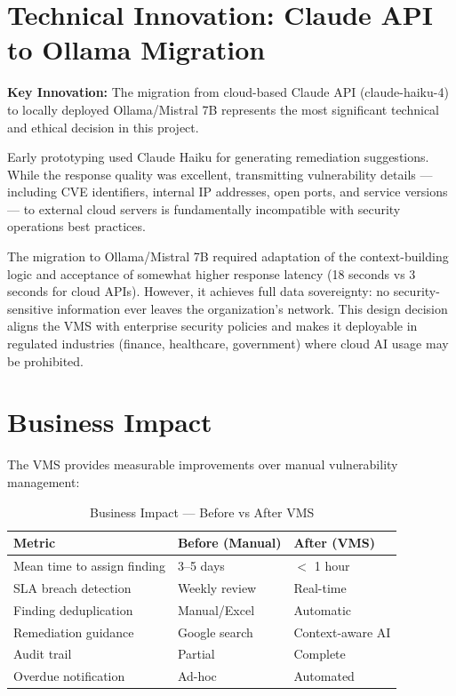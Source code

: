 \section*{Technical Innovation: Claude API to Ollama Migration}

\begin{importantbox}
\textbf{Key Innovation:} The migration from cloud-based Claude API (claude-haiku-4) to locally deployed Ollama/Mistral 7B represents the most significant technical and ethical decision in this project.

Early prototyping used Claude Haiku for generating remediation suggestions. While the response quality was excellent, transmitting vulnerability details — including CVE identifiers, internal IP addresses, open ports, and service versions — to external cloud servers is fundamentally incompatible with security operations best practices.

The migration to Ollama/Mistral 7B required adaptation of the context-building logic and acceptance of somewhat higher response latency (18 seconds vs 3 seconds for cloud APIs). However, it achieves full data sovereignty: no security-sensitive information ever leaves the organization's network. This design decision aligns the VMS with enterprise security policies and makes it deployable in regulated industries (finance, healthcare, government) where cloud AI usage may be prohibited.
\end{importantbox}

\section*{Business Impact}

The VMS provides measurable improvements over manual vulnerability management:

\begin{table}[H]
\centering
\caption{Business Impact — Before vs After VMS}
\begin{tabular}{lll}
\toprule
\textbf{Metric} & \textbf{Before (Manual)} & \textbf{After (VMS)} \\
\midrule
Mean time to assign finding & 3--5 days & $<$ 1 hour \\
SLA breach detection & Weekly review & Real-time \\
Finding deduplication & Manual/Excel & Automatic \\
Remediation guidance & Google search & Context-aware AI \\
Audit trail & Partial & Complete \\
Overdue notification & Ad-hoc & Automated \\
\bottomrule
\end{tabular}
\end{table}

